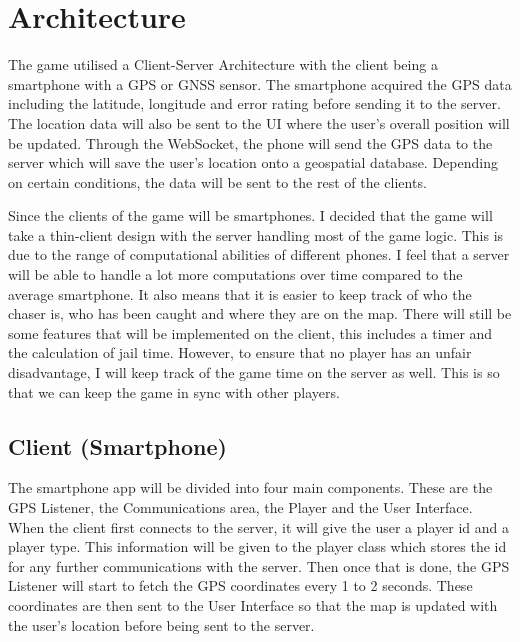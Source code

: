 \documentclass{l4proj}
\begin{document}
\section{Architecture}
\label{phase1architecture}
The game utilised a Client-Server Architecture with the client being a smartphone with a GPS or
GNSS sensor. The smartphone acquired the GPS data including the
latitude, longitude and error rating before sending it to the server. The location data will also be sent 
to the UI where the user's overall position will be updated. Through the WebSocket, the phone will send the GPS data
to the server which will save the user's location onto a geospatial database. Depending on certain conditions, the data
will be sent to the rest of the clients.

Since the clients of the game will be smartphones. I decided that the game will take a thin-client design with the
server handling most of the game logic. This is due to the range of computational abilities of different phones. 
I feel that a server will be able to handle a lot more computations over time compared to the average smartphone.
It also means that it is easier to keep track of who the chaser is, who has been caught and where they are on the map.
There will still be some features that will be implemented on the client, this includes a timer and the calculation of
jail time. However, to ensure that no player has an unfair disadvantage, I will keep track of the game time on the
server as well. This is so that we can keep the game in sync with other players.

\subsection{Client (Smartphone)}
\label{designClient}
The smartphone app will be divided into four main components. These are the GPS Listener, the Communications area, the
Player and the User Interface. When the client first connects to the server, it will give the user a player id and a player
type. This information will be given to the player class which stores the id for any further communications with the server.
Then once that is done, the GPS Listener will start to fetch the GPS coordinates every 1 to 2 seconds. These coordinates are then sent
to the User Interface so that the map is updated with the user's location before being sent to the server.
\end{document}
